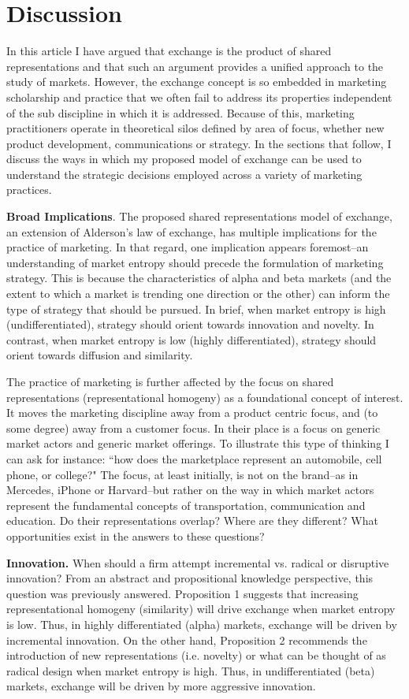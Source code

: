 \section{Discussion}
In this article I have argued that exchange is the product of shared representations and that such an argument provides a unified approach to the study of markets. However, the exchange concept is so embedded in marketing scholarship and practice that we often fail to address its properties independent of the sub discipline in which it is addressed. Because of this, marketing practitioners operate in theoretical silos defined by area of focus, whether new product development, communications or strategy. In the sections that follow, I discuss the ways in which my proposed model of exchange can be used to understand the strategic decisions employed across a variety of marketing practices.

\textbf{Broad Implications}.
The proposed shared representations model of exchange, an extension of Alderson's law of exchange, has multiple implications for the practice of marketing. In that regard, one implication appears foremost--an understanding of market entropy should precede the formulation of marketing strategy. This is because the characteristics of alpha and beta markets (and the extent to which a market is trending one direction or the other) can inform the type of strategy that should be pursued. In brief, when market entropy is high (undifferentiated), strategy should orient towards innovation and novelty. In contrast, when market entropy is low (highly differentiated), strategy should orient towards diffusion and similarity.  

The practice of marketing is further affected by the focus on shared representations (representational homogeny) as a foundational concept of interest. It moves the marketing discipline away from a product centric focus, and (to some degree) away from a customer focus. In their place is a focus on generic market actors and generic market offerings. To illustrate this type of thinking I can ask for instance: ``how does the marketplace represent an automobile, cell phone, or college?" The focus, at least initially, is not on the brand--as in Mercedes, iPhone or Harvard--but rather on the way in which market actors represent the fundamental concepts of transportation, communication and education. Do their representations overlap? Where are they different? What opportunities exist in the answers to these questions?     

\textbf{Innovation.}
When should a firm attempt incremental vs. radical or disruptive innovation? From an abstract and propositional knowledge perspective, this question was previously answered. Proposition 1 suggests that increasing representational homogeny (similarity) will drive exchange when market entropy is low. Thus, in highly differentiated (alpha) markets, exchange will be driven by incremental innovation. On the other hand, Proposition 2 recommends the introduction of new representations (i.e. novelty) or what can be thought of as radical design when market entropy is high. Thus, in undifferentiated (beta) markets, exchange will be driven by more aggressive innovation. 


